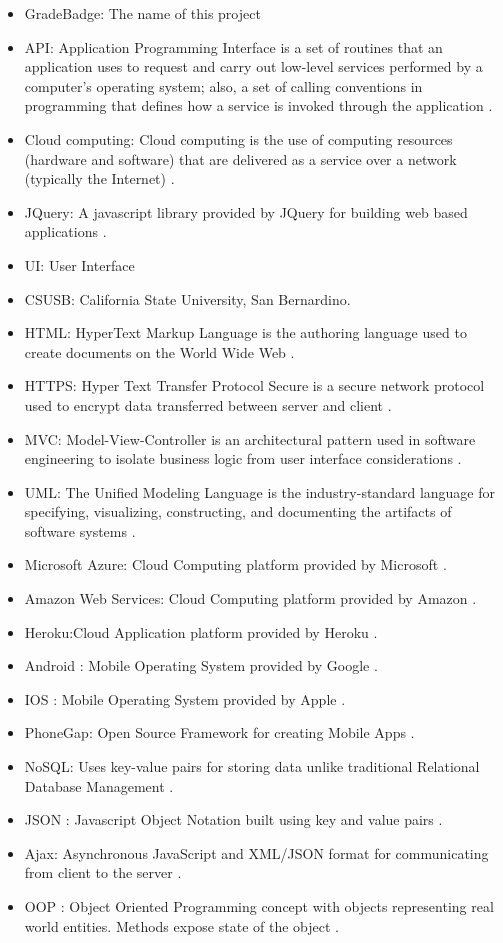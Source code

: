 \begin{itemize}
\item GradeBadge: The name of this project
\item API: Application Programming Interface is a set of routines that an application uses to request and carry out low-level services performed by a computer's operating system; also, a set of calling conventions in programming that defines how a service is invoked through the application \cite{API}.
\item Cloud computing: Cloud computing is the use of computing resources (hardware and software) that are delivered as a service over a network (typically the Internet) \cite{cloudcomputing}.
\item JQuery: A javascript library provided by JQuery for building web based applications \cite{JQuery}.
\item UI: User Interface
\item CSUSB: California State University, San Bernardino.
\item HTML: HyperText Markup Language is the authoring language used to create documents on the World Wide Web \cite{w3}.
\item HTTPS: Hyper Text Transfer Protocol Secure is a secure network protocol used to encrypt data transferred  between server and client \cite{https}.
\item MVC\label{def:mvc}: Model-View-Controller is an architectural pattern used in software engineering to isolate business logic from user interface considerations \cite{mvc}.
\item UML: The Unified Modeling Language is the industry-standard language for specifying, visualizing, constructing, and documenting the artifacts of software systems \cite{uml}.
\item Microsoft Azure: Cloud Computing platform provided by Microsoft \cite{MicrosoftAzure}.
\item Amazon Web Services: Cloud Computing platform provided by Amazon \cite{AWS}.
\item Heroku:Cloud Application platform provided by Heroku \cite{Heroku}.
\item Android : Mobile Operating System provided by Google \cite{Android}.
\item IOS : Mobile Operating System provided by Apple \cite{IOS}.
\item PhoneGap: Open Source Framework for creating Mobile Apps \cite{PhoneGap}.
\item NoSQL: Uses key-value pairs for storing data unlike traditional Relational Database Management \cite{NoSql}.
\item JSON : Javascript Object Notation built using key and value pairs \cite{json}.
\item Ajax:  Asynchronous JavaScript and XML/JSON format for communicating from client to the server \cite{Ajax}.
\item OOP : Object Oriented Programming concept with objects representing real world entities. Methods expose state of the object \cite{OOP}.
\end{itemize}


